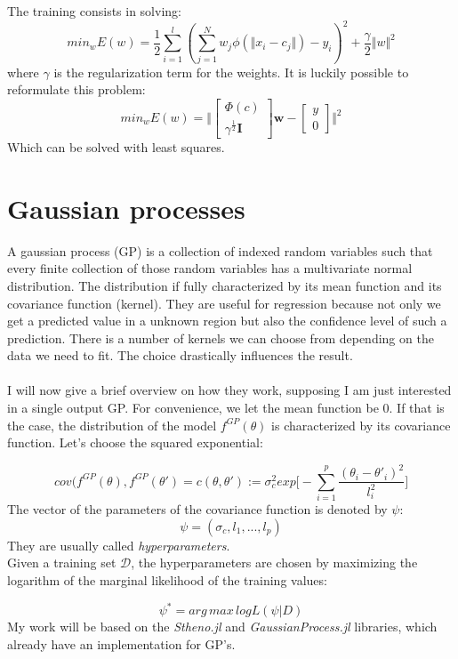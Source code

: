 \documentclass[11pt,a4paper,oneside,titlepage,openright]{book}
\begin{document}
The training consists in solving:
\begin{equation}
min_{w}E(w) = \frac{1}{2}\sum_{i=1}^l (\sum_{j=1}^N w_j \phi(\Vert x_i - c_j \Vert) - y_i)^2 + \frac{\gamma}{2} \Vert w \Vert^2 
\end{equation}
where $\gamma$ is the regularization term for the weights. It is luckily possible to reformulate this problem: 
$$ min_{w}E(w) = \Big\Vert \begin{bmatrix} \Phi(c) \\ \gamma^{\frac{1}{2}}\text{}\mathbf{I}\end{bmatrix}\mathbf{w} - \begin{bmatrix} y \\ 0 \end{bmatrix}\Big\Vert^2$$ 
Which can be solved with least squares.

\section*{Gaussian processes}
A gaussian process (GP) is a collection of indexed random variables such that every finite collection of those random variables has a multivariate normal distribution. The distribution if fully characterized by its mean function and its covariance function (kernel). They are useful for regression because not only we get a predicted value in a unknown region but also the confidence level of such a prediction. 
There is a number of kernels we can choose from depending on the data we need to fit. The choice drastically influences the result.\\\\
I will now give a brief overview on how they work, supposing I am just interested in a single output GP. 
For convenience, we let the mean function be 0. If that is the case, the distribution of the model $f^{GP}(\theta)$
is characterized by its covariance function. Let's choose the squared exponential:

$$ cov(f^{GP}(\theta),f^{GP}(\theta') = c(\theta,\theta') := \sigma^2_c exp\Big[-\sum_{i=1}^p \frac{(\theta_i - \theta'_i)^2}{l^2_i} \Big] $$
The vector of the parameters of the covariance function is denoted by $\psi$:
$$ \psi = (\sigma_c, l_1, ... , l_p)$$
They are usually called \textit{hyperparameters}.\\
Given a training set $\mathcal{D}$, the hyperparameters are chosen by maximizing the logarithm of the marginal likelihood of the training values:

$$ \psi^* = {arg\,max \,} log L (\psi \vert D) $$
My work will be based on the \textit{Stheno.jl} and \textit{GaussianProcess.jl} libraries, which already have an implementation for GP's.
\end{document}
